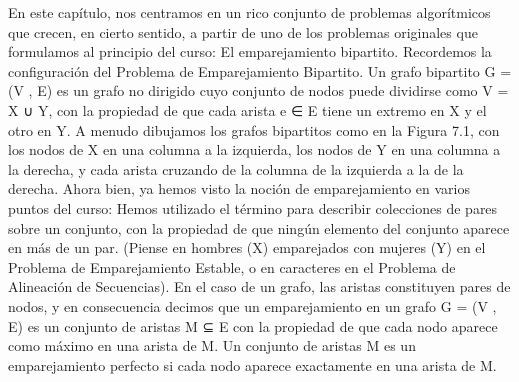 \documentclass[a4paper, 12pt]{book}
\theoremstyle{dotless}
\begin{document}
En este capítulo, nos centramos en un rico conjunto de problemas algorítmicos que crecen, en cierto sentido, a partir de uno de los problemas originales que formulamos al principio del curso: El emparejamiento bipartito.
Recordemos la configuración del Problema de Emparejamiento Bipartito. Un grafo bipartito G = (V , E) es un grafo no dirigido cuyo conjunto de nodos puede dividirse como V = X ∪ Y, con la propiedad de que cada arista e ∈ E tiene un extremo en X y el otro en Y. A menudo dibujamos los grafos bipartitos como en la Figura 7.1, con los nodos de X en una columna a la izquierda, los nodos de Y en una columna a la derecha, y cada arista cruzando de la columna de la izquierda a la de la derecha.
Ahora bien, ya hemos visto la noción de emparejamiento en varios puntos del curso: Hemos utilizado el término para describir colecciones de pares sobre un conjunto, con la propiedad de que ningún elemento del conjunto aparece en más de un par. (Piense en hombres (X) emparejados con mujeres (Y) en el Problema de Emparejamiento Estable, o en caracteres en el Problema de Alineación de Secuencias). En el caso de un grafo, las aristas constituyen pares de nodos, y en consecuencia decimos que un emparejamiento en un grafo G = (V , E) es un conjunto de aristas M ⊆ E con la propiedad de que cada nodo aparece como máximo en una arista de M. Un conjunto de aristas M es un emparejamiento perfecto si cada nodo aparece exactamente en una arista de M.

\end{document}
